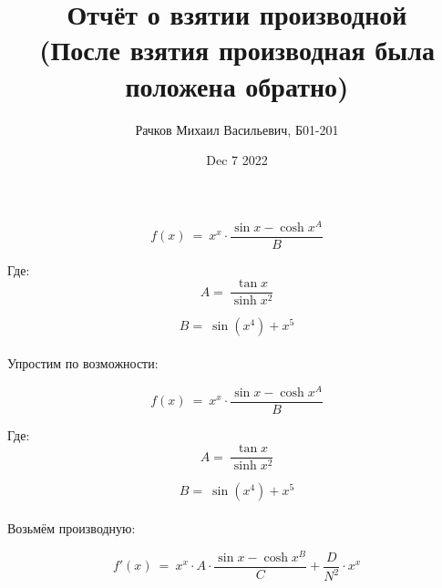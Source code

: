\documentclass[a4paper, 12pt]{article}
\author{Рачков Михаил Васильевич, Б01-201}
\date{Dec  7 2022}
\title{\textbf{Отчёт о взятии производной} \\(После взятия производная была положена обратно)}
\begin{document}
        \maketitle 
            \maketitle
            \begin{equation}
            f(x)~=~x ^ {x} \cdot \dfrac{ \sin x -  \cosh x ^ {A} }{ B}
    \end{equation}
    
    Где: \\
    
            \begin{equation}
            A =~\dfrac{ \tan x }{  \sinh x ^ {2}}
            \end{equation}
            
            \begin{equation}
            B =~ \sin (x ^ {4}) + x ^ {5}
            \end{equation}
            \\ Упростим по возможности: \\
            \maketitle
            \begin{equation}
            f(x)~=~x ^ {x} \cdot \dfrac{ \sin x -  \cosh x ^ {A} }{ B}
    \end{equation}
    
    Где: \\
    
            \begin{equation}
            A =~\dfrac{ \tan x }{  \sinh x ^ {2}}
            \end{equation}
            
            \begin{equation}
            B =~ \sin (x ^ {4}) + x ^ {5}
            \end{equation}
            \\ Возьмём производную: \\
            \maketitle
            \begin{equation}
            f'(x)~=~x ^ {x} \cdot A \cdot \dfrac{ \sin x -  \cosh x ^ {B} }{ C} + \dfrac{D }{ N ^ {2}} \cdot x ^ {x}
    \end{equation}
    
\end{document}
